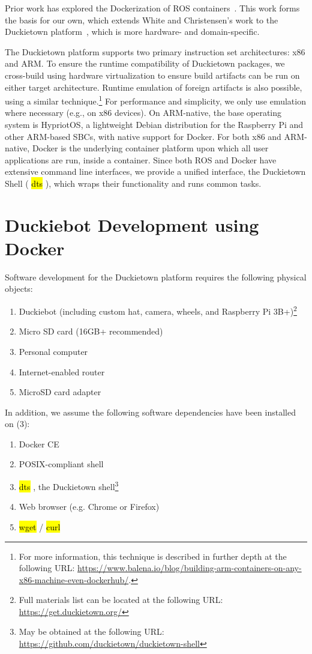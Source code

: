 \documentclass[12pt,initial,twoside,maitrise]{dms}
\newcommand{\inline}[1]{%
\begingroup%
\sethlcolor{slightgray}%
\hl{\ttfamily\small #1}%
\endgroup
}
\numberwithin{equation}{section}
\numberwithin{table}{chapter}
\numberwithin{figure}{chapter}
\begin{document}
Prior work has explored the Dockerization of ROS containers~\citep{white2017ros-docker}. This work forms the basis for our own, which extends White and Christensen's work to the Duckietown platform~\citep{paull2017duckietown}, which is more hardware- and domain-specific.

The Duckietown platform supports two primary instruction set architectures: x86 and ARM. To ensure the runtime compatibility of Duckietown packages, we cross-build using hardware virtualization to ensure build artifacts can be run on either target architecture. Runtime emulation of foreign artifacts is also possible, using a similar technique.\footnote{For more information, this technique is described in further depth at the following URL: \url{https://www.balena.io/blog/building-arm-containers-on-any-x86-machine-even-dockerhub/}.} For performance and simplicity, we only use emulation where necessary (e.g., on x86 devices). On ARM-native, the base operating system is HypriotOS, a lightweight Debian distribution for the Raspberry Pi and other ARM-based SBCs, with native support for Docker. For both x86 and ARM-native, Docker is the underlying container platform upon which all user applications are run, inside a container. Since both ROS and Docker have extensive command line interfaces, we provide a unified interface, the Duckietown Shell (\inline{dts}), which wraps their functionality and runs common tasks.

\section{Duckiebot Development using Docker}

\noindent Software development for the Duckietown platform requires the following physical objects:
%
\begin{enumerate}
    \item Duckiebot (including custom hat, camera, wheels, and Raspberry Pi 3B+)\footnote{Full materials list can be located at the following URL: \url{https://get.duckietown.org/}}
    \item Micro SD card (16GB+ recommended)
    \item Personal computer
    \item Internet-enabled router
    \item MicroSD card adapter
\end{enumerate}
%
In addition, we assume the following software dependencies have been installed on (3):
%
\begin{enumerate}[label=(\alph*)]
    \item Docker CE
    \item POSIX-compliant shell
    \item \inline{dts}, the Duckietown shell\footnote{May be obtained at the following URL: \url{https://github.com/duckietown/duckietown-shell}}
    \item Web browser (e.g. Chrome or Firefox)
    \item \inline{wget}/\inline{curl}
\end{enumerate}
\end{document}
